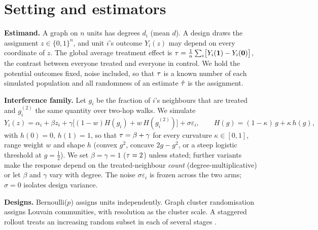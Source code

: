 \section{Setting and estimators}\label{sec:setup}
\textbf{Estimand.}
A graph on $n$ units has degrees $d_i$ (mean $d$). A design draws the assignment $z\in\{0,1\}^n$, and unit $i$'s outcome $Y_i(z)$ may depend on every coordinate of $z$.
The global average treatment effect is $\tau=\frac1n\sum_i\bigl[Y_i(\mathbf 1)-Y_i(\mathbf 0)\bigr]$, the contrast between everyone treated and everyone in control.
We hold the potential outcomes fixed, noise included, so that $\tau$ is a known number of each simulated population and all randomness of an estimate $\hat\tau$ is the assignment.

\textbf{Interference family.}
Let $g_i$ be the fraction of $i$'s neighbours that are treated and $g_i^{(2)}$ the same quantity over two-hop walks. We simulate
\begin{equation}
Y_i(z)=\alpha_i+\beta z_i+\gamma\bigl[(1-w)H(g_i)+w\,H(g_i^{(2)})\bigr]+\sigma\varepsilon_i,\qquad H(g)=(1-\kappa)\,g+\kappa\,h(g),\label{eq:family}
\end{equation}
with $h(0)=0$, $h(1)=1$, so that $\tau=\beta+\gamma$ for every curvature $\kappa\in[0,1]$, range weight $w$ and shape $h$ (convex $g^2$, concave $2g-g^2$, or a steep logistic threshold at $g=\tfrac12$).
We set $\beta=\gamma=1$ ($\tau=2$) unless stated; further variants make the response depend on the treated-neighbour \emph{count} (degree-multiplicative) or let $\beta$ and $\gamma$ vary with degree. The noise $\sigma\varepsilon_i$ is frozen across the two arms; $\sigma=0$ isolates design variance.

\textbf{Designs.}
Bernoulli($p$) assigns units independently. Graph cluster randomisation \citep{ugander2013graph} assigns Louvain communities, with resolution as the cluster scale. A staggered rollout treats an increasing random subset in each of several stages \citep{cortez2022staggered}.

